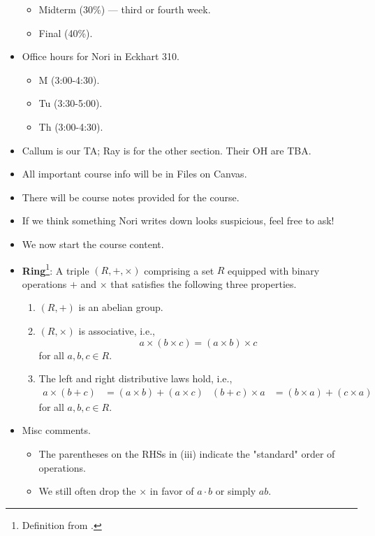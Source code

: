 \documentclass[../notes.tex]{subfiles}
\begin{document}
\begin{itemize}
\begin{itemize}
        \item Midterm (30\%) --- third or fourth week.
        \item Final (40\%).
    \end{itemize}
    \item Office hours for Nori in Eckhart 310.
    \begin{itemize}
        \item M (3:00-4:30).
        \item Tu (3:30-5:00).
        \item Th (3:00-4:30).
    \end{itemize}
    \item Callum is our TA; Ray is for the other section. Their OH are TBA.
    \item All important course info will be in Files on Canvas.
    \item There will be course notes provided for the course.
    \item If we think something Nori writes down looks suspicious, feel free to ask!
    \item We now start the course content.
    \item \textbf{Ring}\footnote{Definition from \textcite{bib:DummitFoote}.}: A triple $(R,+,\times)$ comprising a set $R$ equipped with binary operations $+$ and $\times$ that satisfies the following three properties.
    \begin{enumerate}[label={(\roman*)}]
        \item $(R,+)$ is an abelian group.
        \item $(R,\times)$ is associative, i.e.,
        \begin{equation*}
            a\times(b\times c) = (a\times b)\times c
        \end{equation*}
        for all $a,b,c\in R$.
        \item The left and right distributive laws hold, i.e.,
        \begin{align*}
            a\times(b+c) &= (a\times b)+(a\times c)&
            (b+c)\times a &= (b\times a)+(c\times a)
        \end{align*}
        for all $a,b,c\in R$.
    \end{enumerate}
    \item Misc comments.
    \begin{itemize}
        \item The parentheses on the RHSs in (iii) indicate the "standard" order of operations.
        \item We still often drop the $\times$ in favor of $a\cdot b$ or simply $ab$.

\end{itemize}
\end{itemize}
\end{document}
